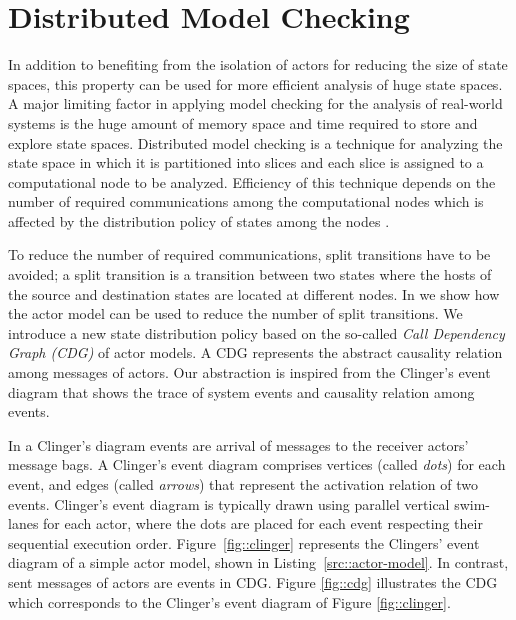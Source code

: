 \section{Distributed Model Checking} \label{sec::DMC}
In addition to benefiting from the isolation of actors for reducing the size of state spaces, this property can be used for more efficient analysis of huge state spaces. A major limiting factor in applying model checking for the analysis of real-world systems is the huge amount of memory space and time required to store and explore state spaces. Distributed model checking is a technique for analyzing the state space in which it is partitioned into slices and each slice is assigned to a computational node to be analyzed. Efficiency of this technique depends on the number of required communications among the computational nodes which is affected by the distribution policy of states among the nodes \cite{DBLP:journals/entcs/OrzanPE05}. 

To reduce the number of required communications, split transitions have to be avoided; a split transition is a transition between two states where the hosts of the source and destination states are located at different nodes. In \cite{DBLP:journals/eceasst/KhamespanahSMSR15} we show how the actor model can be used to reduce the number of split transitions. We introduce a new state distribution policy based on the so-called \textit{Call Dependency Graph (CDG)} of actor models. A CDG represents the abstract causality relation among messages of actors. Our abstraction is inspired from the Clinger's event diagram \cite{clinger} that shows the trace of system events and causality relation among events. 

In a Clinger's diagram events are arrival of messages to the receiver actors' message bags. A Clinger's event diagram comprises vertices (called \emph{dots}) for each event, and edges (called \emph{arrows}) that represent the activation relation of two events. Clinger's event diagram is typically drawn using parallel vertical swim-lanes for each actor, where the dots are placed for each event respecting their sequential execution order. Figure~\ref{fig::clinger} represents the Clingers' event diagram of a simple actor model, shown in Listing~\ref{src::actor-model}. In contrast, sent messages of actors are events in CDG. 
Figure \ref{fig::cdg} illustrates the CDG which corresponds to the Clinger's event diagram of Figure \ref{fig::clinger}.


